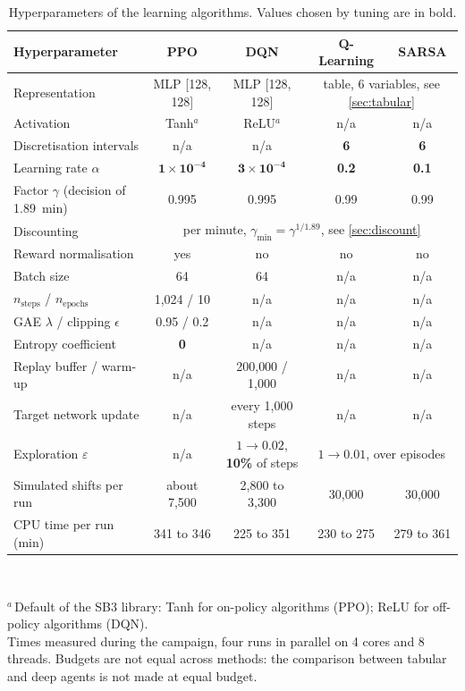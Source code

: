 \documentclass[11pt,a4paper]{article}
\newif\ifrevmarks
\newcommand{\revtag}[1]{\ifrevmarks\textsuperscript{\textcolor{red!70!black}{\scriptsize[#1]}}\fi}
\newcommand{\rev}[2]{\ifrevmarks{\color{revcolor}#2}\revtag{#1}\else#2\fi}
\newif\ifcorrmarks
\newcommand{\corr}[1]{\ifcorrmarks\textcolor{corrcolor}{#1}\else#1\fi}
\begin{document}
\begin{table}[H]
\centering
\caption{\rev{M12, v3}{Hyperparameters of the learning algorithms. Values chosen by tuning are in bold.}}
\label{tab:hyper}
\footnotesize
\setlength{\tabcolsep}{4pt}
\begin{tabular}{lcccc}
\toprule
\textbf{Hyperparameter} & \textbf{PPO} & \textbf{DQN} & \textbf{Q-Learning} & \textbf{SARSA} \\
\midrule
Representation                 & MLP [128, 128] & MLP [128, 128] & \multicolumn{2}{c}{table, 6 variables, see \cref{sec:tabular}} \\
Activation                     & Tanh$^{a}$     & ReLU$^{a}$     & n/a & n/a \\
Discretisation intervals       & n/a & n/a & \textbf{6} & \textbf{6} \\
Learning rate $\alpha$         & $\mathbf{1\times10^{-4}}$ & $\mathbf{3\times10^{-4}}$ & \textbf{0.2} & \textbf{0.1} \\
Factor $\gamma$ (decision of 1.89~min) & 0.995 & 0.995 & 0.99 & 0.99 \\
Discounting                    & \multicolumn{4}{c}{per minute, $\gamma_{\min} = \gamma^{1/1.89}$, see \cref{sec:discount}} \\
Reward normalisation           & yes & no & no & no \\
Batch size                     & 64             & 64             & n/a & n/a \\
$n_{\mathrm{steps}}$ / $n_{\mathrm{epochs}}$ & 1{,}024 / 10 & n/a & n/a & n/a \\
GAE $\lambda$ / clipping $\epsilon$ & 0.95 / 0.2 & n/a & n/a & n/a \\
Entropy coefficient            & \textbf{0}     & n/a & n/a & n/a \\
Replay buffer / warm-up        & n/a & 200{,}000 / 1{,}000 & n/a & n/a \\
Target network update          & n/a & every 1{,}000 steps & n/a & n/a \\
Exploration $\varepsilon$      & n/a & $1\to0.02$, \textbf{10\%} of steps & \multicolumn{2}{c}{$1\to0.01$, over episodes} \\
\corr{Simulated shifts per run} & \corr{about 7{,}500} & \corr{2{,}800 to 3{,}300} & \corr{30{,}000} & \corr{30{,}000} \\
\corr{CPU time per run (min)} & \corr{341 to 346} & \corr{225 to 351} & \corr{230 to 275} & \corr{279 to 361} \\
\bottomrule
\end{tabular}
\\[4pt]
\raggedright
\footnotesize $^{a}$\,Default of the SB3 library: Tanh for on-policy algorithms (PPO); ReLU for off-policy algorithms (DQN).\\
\corr{Times measured during the campaign, four runs in parallel on 4 cores and 8 threads. Budgets are not equal across methods: the comparison between tabular and deep agents is not made at equal budget.}\\
\end{table}
\end{document}
